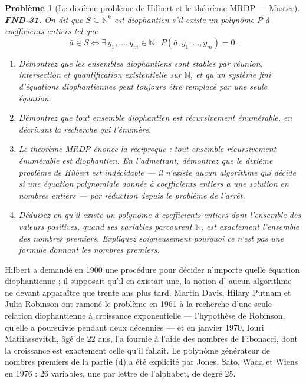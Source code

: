 \documentclass[11pt]{article}
\newtheorem{problem}{Problème}
\begin{document}
\bigskip

\begin{problem}[{Le dixième problème de Hilbert et le théorème MRDP --- Master}]
\textbf{FND-31.} On dit que $ S \subseteq \mathbb{N}^k $ est \textit{diophantien} s'il existe un
polynôme $ P $ à coefficients entiers tel que
\[ \bar{a} \in S \iff \exists\, y_1, \ldots, y_m \in \mathbb{N} : \;
P(\bar{a}, y_1, \ldots, y_m) = 0 . \]
\begin{enumerate}
\item[(a)] Démontrez que les ensembles diophantiens sont stables par réunion, intersection et
quantification existentielle sur $\mathbb{N}$, et qu'un système fini d'équations diophantiennes peut toujours
être remplacé par une seule équation.
\item[(b)] Démontrez que tout ensemble diophantien est récursivement énumérable, en décrivant la
recherche qui l'énumère.
\item[(c)] Le théorème MRDP énonce la réciproque : tout ensemble récursivement énumérable est
diophantien. En l'admettant, démontrez que le dixième problème de Hilbert est indécidable --- il
n'existe aucun algorithme qui décide si une équation polynomiale donnée à coefficients entiers a
une solution en nombres entiers --- par réduction depuis le problème de l'arrêt.
\item[(d)] Déduisez-en qu'il existe un polynôme à coefficients entiers dont l'ensemble des valeurs
positives, quand ses variables parcourent $\mathbb{N}$, est exactement l'ensemble des nombres premiers.
Expliquez soigneusement pourquoi ce n'est pas une formule donnant les nombres premiers.
\end{enumerate}

\end{problem}

\noindent Hilbert a demandé en 1900 une procédure pour décider n'importe quelle équation
diophantienne ; il supposait qu'il en existait une, la notion d'\og{} aucun algorithme \fg{} ne devant
apparaître que trente ans plus tard. Martin Davis, Hilary Putnam et Julia Robinson ont ramené le
problème en 1961 à la recherche d'une seule relation diophantienne à croissance exponentielle ---
l'hypothèse de Robinson, qu'elle a poursuivie pendant deux décennies --- et en janvier 1970, Iouri
Matiiassevitch, âgé de 22 ans, l'a fournie à l'aide des nombres de Fibonacci, dont la croissance
est exactement celle qu'il fallait. Le polynôme générateur de nombres premiers de la partie (d) a
été explicité par Jones, Sato, Wada et Wiens en 1976 : 26 variables, une par lettre de l'alphabet,
de degré 25.
\end{document}
